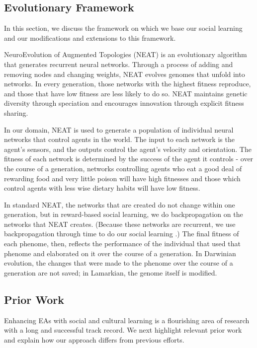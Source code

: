 \documentclass{acm_proc_article-sp}
\begin{document}
\subsection*{Evolutionary Framework}
In this section, we discuss the framework on which we base our social learning and our modifications and extensions to this framework.

NeuroEvolution of Augmented Topologies (NEAT)\cite{stanley2002evolving} is an evolutionary algorithm that generates recurrent neural networks. Through a process of adding and removing nodes and changing weights, NEAT evolves genomes that unfold into networks. In every generation, those networks with the highest fitness reproduce, and those that have low fitness are less likely to do so. NEAT maintains genetic diversity through speciation and encourages innovation through explicit fitness sharing.

In our domain, NEAT is used to generate a population of individual neural networks that control agents in the world. The input to each network is the agent's sensors, and the outputs control the agent's velocity and orientation. The fitness of each network is determined by the success of the agent it controls - over the course of a generation, networks controlling agents who eat a good deal of rewarding food and very little poison will have high fitnesses and those which control agents with less wise dietary habits will have low fitness.

In standard NEAT, the networks that are created do not change within one generation, but in reward-based social learning, we do backpropagation\cite{rumelhart1986learning} on the networks that NEAT creates. (Because these networks are recurrent, we use backpropagation through time to do our social learning \cite{werbos1990backpropagation}.) The final fitness of each phenome, then, reflects the performance of the individual that used that phenome and elaborated on it over the course of a generation. In Darwinian evolution, the changes that were made to the phenome over the course of a generation are not saved; in Lamarkian, the genome itself is modified.

\subsection*{Prior Work}

Enhancing EAs with social and cultural learning is a flourishing area of research with a long and successful track record. We next highlight relevant prior work and explain how our approach differs from previous efforts.
\end{document}
